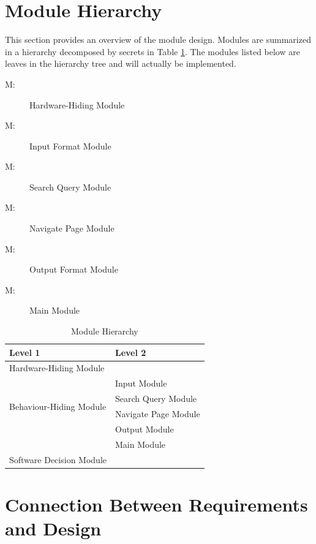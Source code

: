 \documentclass[12pt, titlepage]{article}
\newcounter{mnum}
\newcommand{\mthemnum}{M\themnum}
\begin{document}
\newpage

\section{Module Hierarchy} \label{SecMH}

This section provides an overview of the module design. Modules are summarized
in a hierarchy decomposed by secrets in Table \ref{TblMH}. The modules listed
below are leaves in the hierarchy tree and will actually be implemented.

\begin{description}
\item [ \mthemnum \label{mHH}:] Hardware-Hiding Module
\item [ \mthemnum \label{mInput}:] Input Format Module
\item [ \mthemnum \label{mSQ}:] Search Query Module
\item [ \mthemnum \label{mNP}:] Navigate Page Module
\item [ \mthemnum \label{mOutput}:] Output Format Module
\item [ \mthemnum \label{mMain}:] Main Module
\end{description}


\begin{table}[h!]
\centering
\begin{tabular}{p{} p{}}
\toprule
\textbf{Level 1} & \textbf{Level 2}\\
\midrule

{Hardware-Hiding Module} & ~ \\
\midrule

\multirow{4}{0.3\textwidth}{Behaviour-Hiding Module} 
& Input Module\\
& Search Query Module\\
& Navigate Page Module\\
& Output Module\\
& Main Module\\
\midrule

{Software Decision Module} & ~ \\
\bottomrule

\end{tabular}
\caption{Module Hierarchy}
\label{TblMH}
\end{table}

\section{Connection Between Requirements and Design} \label{SecConnection}
\end{document}
